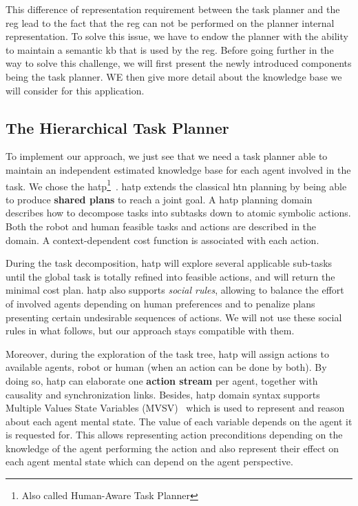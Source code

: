 This difference of representation requirement between the task planner and the \acrshort{reg} lead to the fact that the \acrshort{reg} can not be performed on the planner internal representation. To solve this issue, we have to endow the planner with the ability to maintain a semantic \acrshort{kb} that is used by the \acrshort{reg}. Before going further in the way to solve this challenge, we will first present the newly introduced components being the task planner. WE then give more detail about the knowledge base we will consider for this application.


\subsection{The Hierarchical Task Planner}

To implement our approach, we just see that we need a task planner able to maintain an independent estimated knowledge base for each agent involved in the task. We chose the \acrfull{hatp}\footnote{Also called Human-Aware Task Planner}~\cite{lallement_2014_hatp}. \acrshort{hatp} extends the classical \acrfull{htn} planning by being able to produce \textbf{shared plans} to reach a joint goal. A \acrshort{hatp} planning domain describes how to decompose tasks into subtasks down to atomic symbolic actions. Both the robot and human feasible tasks and actions are described in the domain. A context-dependent cost function is associated with each action. 

During the task decomposition, \acrshort{hatp} will explore several applicable sub-tasks until the global task is totally refined into feasible actions, and will return the minimal cost plan. \acrshort{hatp} also supports \textit{social rules}, allowing to balance the effort of involved agents depending on human preferences and to penalize plans presenting certain undesirable sequences of actions. We will not use these social rules in what follows, but our approach stays compatible with them.

Moreover, during the exploration of the task tree, \acrshort{hatp} will assign actions to available agents, robot or human (when an action can be done by both). By doing so, \acrshort{hatp} can elaborate one \textbf{action stream} per agent, together with causality and synchronization links. 
Besides, \acrshort{hatp} domain syntax supports Multiple Values State Variables (MVSV)~\cite{guitton_2012_belief} which is used to represent and reason about each agent mental state. The value of each variable depends on the agent it is requested for. This allows representing action preconditions depending on the knowledge of the agent performing the action and also represent their effect on each agent mental state which can depend on the agent perspective.

